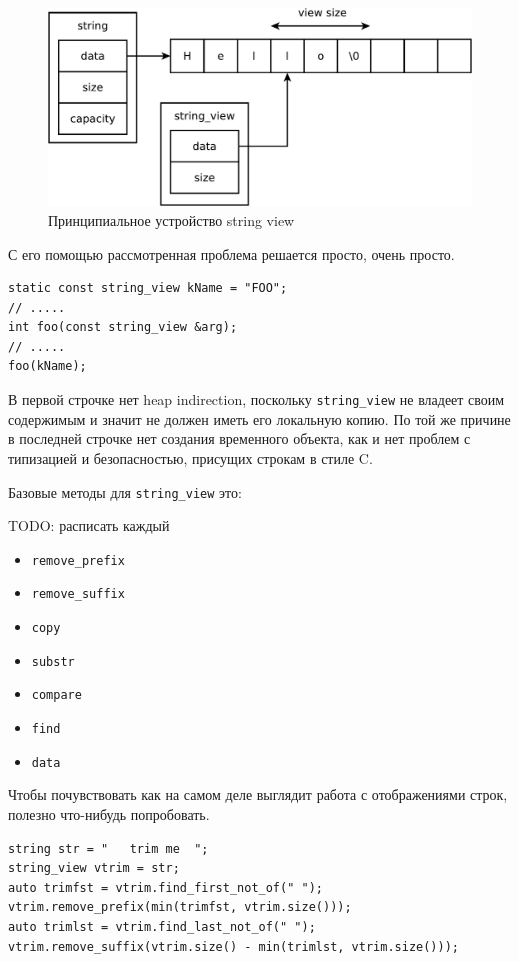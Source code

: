 \documentclass[a4paper,12pt,oneside]{article}
\begin{document}
\begin{figure}[ht]
\centering
\includegraphics[width=1.0\textwidth]{illustrations/stringview-principal-crop.pdf}
\caption{Принципиальное устройство string view}
\label{fig:stringview-principal}
\end{figure}

С его помощью рассмотренная проблема решается просто, очень просто.

\begin{lstlisting}
static const string_view kName = "FOO";
// .....
int foo(const string_view &arg);
// .....
foo(kName);
\end{lstlisting}

В первой строчке нет heap indirection, поскольку \lstinline!string_view! не владеет своим содержимым и значит не должен иметь его локальную копию. По той же причине в последней строчке нет создания временного объекта, как и нет проблем с типизацией и безопасностью, присущих строкам в стиле C.

Базовые методы для \lstinline!string_view! это:

TODO: расписать каждый

\begin{itemize}
\item \lstinline!remove_prefix!
\item \lstinline!remove_suffix!
\item \lstinline!copy!
\item \lstinline!substr!
\item \lstinline!compare!
\item \lstinline!find!
\item \lstinline!data!
\end{itemize}

Чтобы почувствовать как на самом деле выглядит работа с отображениями строк, полезно что-нибудь попробовать.

\begin{lstlisting}
string str = "   trim me  ";
string_view vtrim = str;
auto trimfst = vtrim.find_first_not_of(" ");
vtrim.remove_prefix(min(trimfst, vtrim.size()));
auto trimlst = vtrim.find_last_not_of(" ");
vtrim.remove_suffix(vtrim.size() - min(trimlst, vtrim.size()));
\end{lstlisting}
\end{document}
